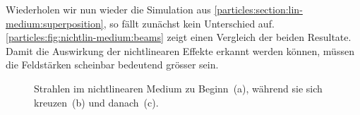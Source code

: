 Wiederholen wir nun wieder die Simulation aus \autoref{particles:section:lin-medium:superposition}, so fällt zunächst kein Unterschied auf.
\autoref{particles:fig:nichtlin-medium:beams} zeigt einen Vergleich der beiden Resultate.
Damit die Auswirkung der nichtlinearen Effekte erkannt werden können, müssen die Feldstärken scheinbar bedeutend grösser sein.
\begin{figure}
    \centering
    \label{particles:fig:nichtlin-medium:beams-1}\hfill
    \label{particles:fig:nichtlin-medium:beams-2}\hfill
    \label{particles:fig:nichtlin-medium:beams-3}
    \caption{Strahlen im nichtlinearen Medium zu Beginn~(a), während sie sich kreuzen~(b) und danach~(c).}\label{particles:fig:nichtlin-medium:beams}
\end{figure}


